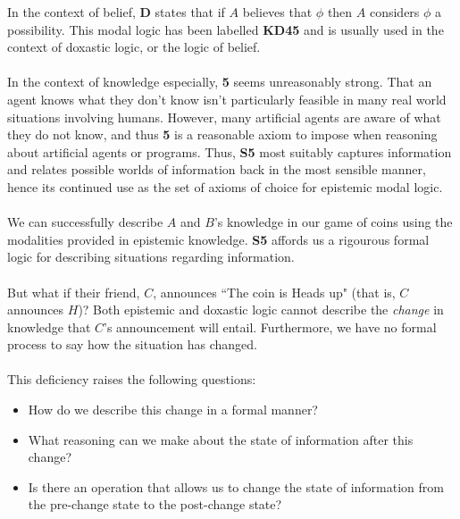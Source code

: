 \documentclass[12pt, a4paper, titlepage]{scrartcl}
\begin{document}
In the context of belief, {\bf D} states that if $A$ believes that $\phi$ then
$A$ considers $\phi$ a possibility.
This modal logic has been labelled {\bf KD45} and is usually used in the context
of doxastic logic, or the logic of belief.\\
\\
In the context of knowledge especially, {\bf 5} seems unreasonably strong.
That an agent knows what they don't know isn't particularly feasible in many
real world situations involving humans.
However, many artificial agents are aware of what they do not know, and thus
{\bf 5} is a reasonable axiom to impose when reasoning about artificial agents
or programs.
Thus, {\bf S5} most suitably captures information and relates possible
worlds of information back in the most sensible manner, hence its continued use
as the set of axioms of choice for epistemic modal logic. \citep{hoek2008dynamic}\\
\\
We can successfully describe $A$ and $B$'s knowledge in our game of coins using
the modalities provided in epistemic knowledge.
{\bf S5} affords us a rigourous formal logic for describing situations regarding
information.\\
\\
But what if their friend, $C$, announces ``The coin is Heads up" (that is,
$C$ announces $H$)?
Both epistemic and doxastic logic cannot describe the {\em change} in knowledge that
$C$'s announcement will entail.
Furthermore, we have no formal process to say how the situation has changed.\\
\\
This deficiency raises the following questions:
\begin{itemize}
	\item How do we describe this change in a formal manner?
	\item What reasoning can we make about the state of information after this
	change?
	\item Is there an operation that allows us to change the state of information
	from the pre-change state to the post-change state?
\end{itemize}
\end{document}
